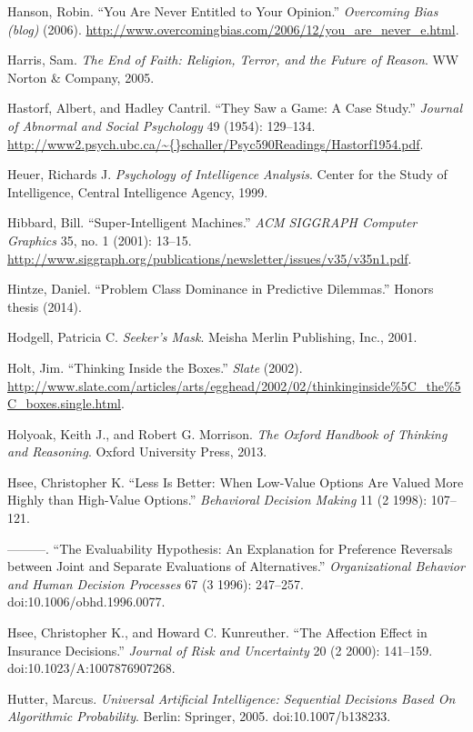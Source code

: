 \documentclass[letterpaper]{book}
\begin{document}
{
 Hanson, Robin. ``You Are Never Entitled to Your
Opinion.'' \textit{Overcoming Bias (blog)} (2006).
\url{http://www.overcomingbias.com/2006/12/you\_are\_never\_e.html}.}

{
 Harris, Sam. \textit{The End of Faith: Religion, Terror, and the
Future of Reason}. WW Norton \& Company, 2005.}

{
 Hastorf, Albert, and Hadley Cantril. ``They Saw a
Game: A Case Study.'' \textit{Journal of Abnormal and
Social Psychology} 49 (1954): 129--134.
\url{http://www2.psych.ubc.ca/\~{}schaller/Psyc590Readings/Hastorf1954.pdf}.}

{
 Heuer, Richards J. \textit{Psychology of Intelligence Analysis}.
Center for the Study of Intelligence, Central Intelligence Agency,
1999.}

{
 Hibbard, Bill. ``Super-Intelligent
Machines.'' \textit{ACM SIGGRAPH Computer Graphics}
35, no. 1 (2001): 13--15.
\url{http://www.siggraph.org/publications/newsletter/issues/v35/v35n1.pdf}.}

{
 Hintze, Daniel. ``Problem Class Dominance in
Predictive Dilemmas.'' Honors thesis (2014).}

{
 Hodgell, Patricia C. \textit{Seeker's Mask}.
Meisha Merlin Publishing, Inc., 2001.}

{
 Holt, Jim. ``Thinking Inside the
Boxes.'' \textit{Slate} (2002).
\url{http://www.slate.com/articles/arts/egghead/2002/02/thinkinginside\%5C\_the\%5C\_boxes.single.html}.}

{
 Holyoak, Keith J., and Robert G. Morrison. \textit{The Oxford
Handbook of Thinking and Reasoning}. Oxford University Press, 2013.}

{
 Hsee, Christopher K. ``Less Is Better: When
Low-Value Options Are Valued More Highly than High-Value
Options.'' \textit{Behavioral Decision Making} 11 (2
1998): 107--121.}

{
 {}---{}---{}---. ``The Evaluability Hypothesis:
An Explanation for Preference Reversals between Joint and Separate
Evaluations of Alternatives.'' \textit{Organizational
Behavior and Human Decision Processes} 67 (3 1996): 247--257.
doi:10.1006/obhd.1996.0077.}

{
 Hsee, Christopher K., and Howard C. Kunreuther.
``The Affection Effect in Insurance
Decisions.'' \textit{Journal of Risk and Uncertainty}
20 (2 2000): 141--159. doi:10.1023/A:1007876907268.}

{
 Hutter, Marcus. \textit{Universal Artificial Intelligence:
Sequential Decisions Based On Algorithmic Probability}. Berlin:
Springer, 2005. doi:10.1007/b138233.}
\end{document}
